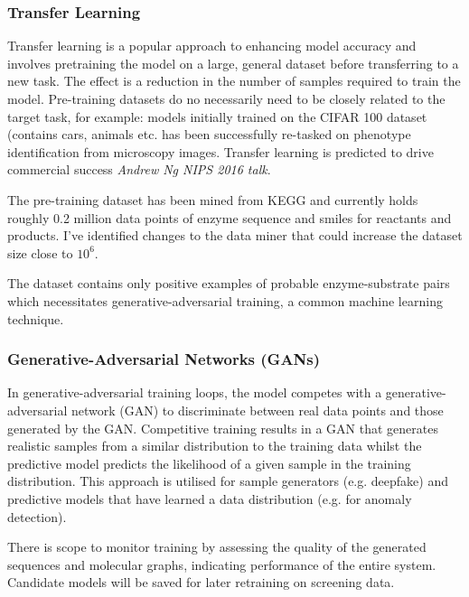 \documentclass{article}
\begin{document}
\subsubsection{Transfer Learning}
Transfer learning is a popular approach to enhancing model accuracy and involves pretraining the model on a large, general dataset before transferring to a new task. The effect is a reduction in the number of samples required to train the model. Pre-training datasets do no necessarily need to be closely related to the target task, for example: models initially trained on the CIFAR 100 dataset (contains cars, animals etc. has been successfully re-tasked on phenotype identification from microscopy images. Transfer learning is predicted to drive commercial success \textit{Andrew Ng NIPS 2016 talk}. %
\par
The pre-training dataset has been mined from KEGG and currently holds roughly 0.2 million data points of enzyme sequence and smiles for reactants and products. I've identified changes to the data miner that could increase the dataset size close to $10^6$.  %
\par
The dataset contains only positive examples of probable enzyme-substrate pairs which necessitates generative-adversarial training, a common machine learning technique. %
\par
\subsubsection{Generative-Adversarial Networks (GANs)}
In generative-adversarial training loops, the model competes with a generative-adversarial network (GAN) to discriminate between real data points and those generated by the GAN. Competitive training results in a GAN that generates realistic samples from a similar distribution to the training data whilst the predictive model predicts the likelihood of a given sample in the training distribution. This approach is utilised for sample generators (e.g. deepfake) and predictive models that have learned a data distribution (e.g. for anomaly detection). %
\par
There is scope to monitor training by assessing the quality of the generated sequences and molecular graphs, indicating performance of the entire system. %
Candidate models will be saved for later retraining on screening data. %
\par
\end{document}
